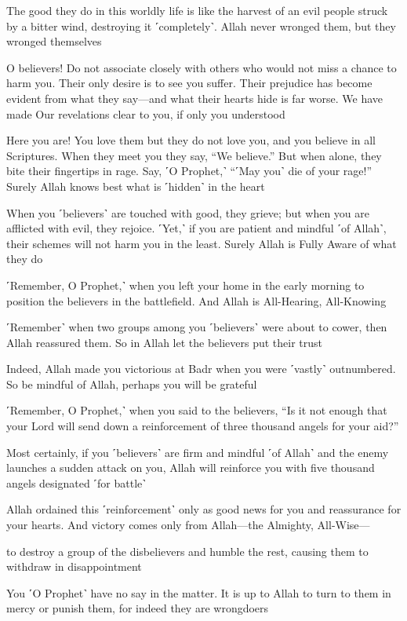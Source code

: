 The good they do in this worldly life is like the harvest of an evil people struck by a bitter wind, destroying it ˹completely˺. Allah never wronged them, but they wronged themselves

O believers! Do not associate closely with others who would not miss a chance to harm you. Their only desire is to see you suffer. Their prejudice has become evident from what they say—and what their hearts hide is far worse. We have made Our revelations clear to you, if only you understood

Here you are! You love them but they do not love you, and you believe in all Scriptures. When they meet you they say, “We believe.” But when alone, they bite their fingertips in rage. Say, ˹O Prophet,˺ “˹May you˺ die of your rage!” Surely Allah knows best what is ˹hidden˺ in the heart

When you ˹believers˺ are touched with good, they grieve; but when you are afflicted with evil, they rejoice. ˹Yet,˺ if you are patient and mindful ˹of Allah˺, their schemes will not harm you in the least. Surely Allah is Fully Aware of what they do

˹Remember, O Prophet,˺ when you left your home in the early morning to position the believers in the battlefield. And Allah is All-Hearing, All-Knowing

˹Remember˺ when two groups among you ˹believers˺ were about to cower, then Allah reassured them. So in Allah let the believers put their trust

Indeed, Allah made you victorious at Badr when you were ˹vastly˺ outnumbered. So be mindful of Allah, perhaps you will be grateful

˹Remember, O Prophet,˺ when you said to the believers, “Is it not enough that your Lord will send down a reinforcement of three thousand angels for your aid?”

Most certainly, if you ˹believers˺ are firm and mindful ˹of Allah˺ and the enemy launches a sudden attack on you, Allah will reinforce you with five thousand angels designated ˹for battle˺

Allah ordained this ˹reinforcement˺ only as good news for you and reassurance for your hearts. And victory comes only from Allah—the Almighty, All-Wise—

to destroy a group of the disbelievers and humble the rest, causing them to withdraw in disappointment

You ˹O Prophet˺ have no say in the matter. It is up to Allah to turn to them in mercy or punish them, for indeed they are wrongdoers

